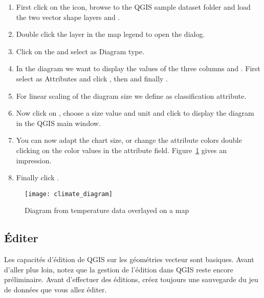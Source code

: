 \begin{itemize}
\begin{enumerate}
\item First click on the  icon,
browse to the QGIS sample dataset folder and load the two vector shape layers
 and .
\item Double click the  layer in the map legend to open the
 dialog.
\item Click on the  and select  as
Diagram type.
\item In the diagram we want to display the values of the three columns
 and . First select
 as Attributes and click , then
 and finally .  
\item For linear scaling of the diagram size we define 
as classification attribute.
\item Now click on , choose a size value and unit
and click  to display the diagram in the QGIS main window.
\item You can now adapt the chart size, or change the attribute colors double
clicking on the color values in the attribute field.
Figure~\ref{fig:climatediagram} gives an impression.
\item Finally click . 
\end{enumerate}

\begin{figure}[ht]
   \begin{center}
   \caption{Diagram from temperature data overlayed on a map \nixcaption}\label{fig:climatediagram}\smallskip
   \texttt{[image: climate\_diagram]}
\end{center}
\end{figure}

\subsection{Éditer}

Les capacités d'édition de QGIS sur les géométries vecteur sont basiques. Avant d'aller plus loin, notez que la gestion de l'édition dans QGIS reste encore préliminaire. Avant d'effectuer des éditions, créez toujours une sauvegarde du jeu de données que vous allez éditer.


\end{itemize}
